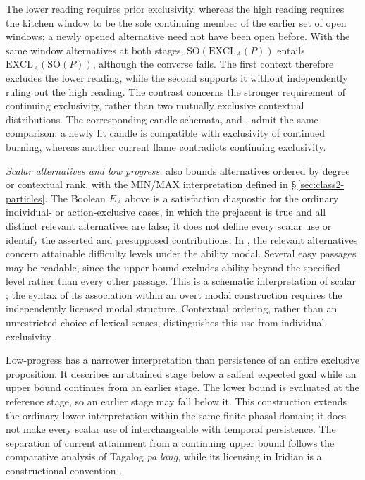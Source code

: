 The lower reading requires prior exclusivity, whereas the high reading
requires the kitchen window to be the sole continuing member of the earlier
set of open windows; a newly opened alternative need not have been open before.
With the same window alternatives at both stages,
$\mathrm{SO}(\mathrm{EXCL}_{A}(P))$ entails
$\mathrm{EXCL}_{A}(\mathrm{SO}(P))$, although the converse fails. The
first context therefore excludes the lower reading, while the second supports
it without independently ruling out the high reading. The contrast concerns
the stronger requirement of continuing exclusivity, rather than two
mutually exclusive contextual distributions. The corresponding candle
schemata,  and
, admit the same
comparison: a newly lit candle is compatible with exclusivity of continued
burning, whereas another current flame contradicts continuing exclusivity.

\noindent\textit{Scalar alternatives and low progress.}\enspace
{} also bounds alternatives ordered by degree or contextual rank,
with the MIN/MAX interpretation defined in §\,\ref{sec:class2-particles}.
The Boolean $E_A$ above is a satisfaction diagnostic for the ordinary
individual- or action-exclusive cases, in which the prejacent is true and
all distinct relevant alternatives are false; it does not define every
scalar use or identify the asserted and presupposed contributions. In
, the relevant alternatives
concern attainable difficulty levels under the ability modal. Several easy
passages may be readable, since the upper bound excludes ability beyond the
specified level rather than every other passage. This is a schematic
interpretation of scalar ; the syntax of its association within
an overt modal construction requires the independently licensed modal
structure. Contextual ordering, rather than an unrestricted choice of
lexical senses, distinguishes this use from individual exclusivity
\cite[§2.3]{coppockbeaver2014}.

Low-progress  has a narrower interpretation than persistence
of an entire exclusive proposition. It describes an attained stage below a
salient expected goal while an upper bound continues from an earlier stage.
The lower bound is evaluated at the reference stage, so an earlier stage may
fall below it. This construction extends the ordinary lower interpretation
within the same finite phasal domain; it does not make every scalar use of
 interchangeable with temporal persistence. The separation of
current attainment from a continuing upper bound follows the comparative
analysis of Tagalog \textit{pa lang}, while its licensing in Iridian is a
constructional convention \cite[§4]{hsieherlewine2023nthu}.

